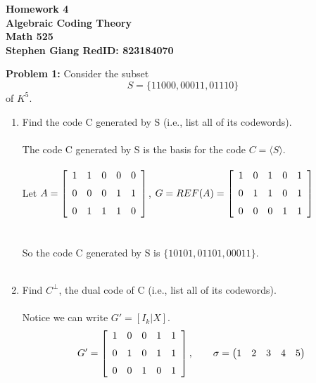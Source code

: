 \documentclass[11pt]{article}
\newcommand{\skipline}{\vspace{\baselineskip}}
\newenvironment{problem}[1]{\textbf{Problem #1: }}{\newpage}
\begin{document}
	
	\begin{center}
		\textbf{Homework 4} \\
		\textbf{Algebraic Coding Theory} \\
		\textbf{Math 525} \\
		\textbf{Stephen Giang RedID: 823184070} \\
		\skipline \skipline
	\end{center}

	\begin{problem}{1}
		Consider the subset
		\[ S = \{11000, 00011, 01110\}\]
		of $K^5$.
		\begin{enumerate}[label = (\alph*)]
			\item Find the code C generated by S (i.e., list all of its codewords).
			\\ \\
			The code C generated by S is the basis for the code $C = \langle S \rangle$.
			\\ \\
			Let $A =  \left[ \begin {array}{ccccc} 1&1&0&0&0\\ \noalign{\medskip}0&0&0&1&1
			\\ \noalign{\medskip}0&1&1&1&0\end {array} \right] $, \qquad
			$G = REF(A) =  \left[ \begin {array}{ccccc} 1&0&1&0&1\\ \noalign{\medskip}0&1&1&0&1
			\\ \noalign{\medskip}0&0&0&1&1\end {array} \right]$
			\\ \\ \\ 
			So the code C generated by S is $\{10101, 01101, 00011\}$.
			\\ \\
			\item Find $C^\perp$, the dual code of C (i.e., list all of its codewords).
			\\ \\
			Notice we can write $G' = [I_k | X]$.
			\[G' = \left[ \begin {array}{ccccc} 1&0&0&1&1\\ \noalign{\medskip}0&1&0&1&1
			\\ \noalign{\medskip}0&0&1&0&1\end {array} \right], \qquad 
			\sigma = \begin{pmatrix}
				1 & 2 & 3 & 4 & 5 \\

\end{pmatrix}\]
\end{enumerate}
\end{problem}
\end{document}
